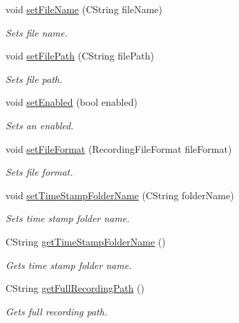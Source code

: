 \begin{DoxyCompactItemize}
void \hyperlink{class_recording_configuration_ab5c1119de723c38b04343642566eb0c0}{set\+File\+Name} (C\+String file\+Name)
\begin{DoxyCompactList}\small\item\em Sets file name. \end{DoxyCompactList}\item 
void \hyperlink{class_recording_configuration_ae3556fef5f881254a64153713897583d}{set\+File\+Path} (C\+String file\+Path)
\begin{DoxyCompactList}\small\item\em Sets file path. \end{DoxyCompactList}\item 
void \hyperlink{class_recording_configuration_a2748b82816a36f64accb011cea6263fa}{set\+Enabled} (bool enabled)
\begin{DoxyCompactList}\small\item\em Sets an enabled. \end{DoxyCompactList}\item 
void \hyperlink{class_recording_configuration_a53c318a0790f5a319448c004e3f8e21c}{set\+File\+Format} (Recording\+File\+Format file\+Format)
\begin{DoxyCompactList}\small\item\em Sets file format. \end{DoxyCompactList}\item 
void \hyperlink{class_recording_configuration_abcdc65db96a0704c33f0c2e537ec01cc}{set\+Time\+Stamp\+Folder\+Name} (C\+String folder\+Name)
\begin{DoxyCompactList}\small\item\em Sets time stamp folder name. \end{DoxyCompactList}\item 
C\+String \hyperlink{class_recording_configuration_a7e460856ed3a0b7de7a74358517069b7}{get\+Time\+Stamp\+Folder\+Name} ()
\begin{DoxyCompactList}\small\item\em Gets time stamp folder name. \end{DoxyCompactList}\item 
C\+String \hyperlink{class_recording_configuration_a0e6a547c0e5b2ac3433654c4c2aca105}{get\+Full\+Recording\+Path} ()
\begin{DoxyCompactList}\small\item\em Gets full recording path. \end{DoxyCompactList}\item 

\end{DoxyCompactItemize}
